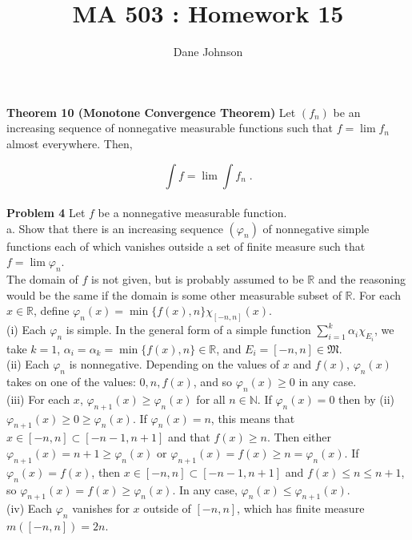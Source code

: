\documentclass[a4paper]{article}
\title{MA 503 : Homework 15}
\author{Dane Johnson}
\begin{document}
\maketitle

{\bf Theorem 10 (Monotone Convergence Theorem)} Let $(f_n)$ be an increasing sequence of nonnegative measurable functions such that $f = \lim f_n$ almost everywhere. Then,

$$\int f = \lim \int f_n \;.$$ \\

{\bf Problem 4} Let $f$ be a nonnegative measurable function. \\

a. Show that there is an increasing sequence $(\varphi_n)$ of nonnegative simple functions each of which vanishes outside a set of finite measure such that $f = \lim \varphi_n$. \\

The domain of $f$ is not given, but is probably assumed to be $\mathbb{R}$ and the reasoning would be the same if the domain is some other measurable subset of $\mathbb{R}$. For each $x \in \mathbb{R}$, define $\varphi_n(x) = \min\{f(x), n\} \chi_{[-n,n]} (x)$. \\

(i) Each $\varphi_n$ is simple. In the general form of a simple function $\sum_{i=1}^k \alpha_i \chi_{E_i}$, we take $k = 1$, $\alpha_i = \alpha_k = \min \{f(x), n\} \in \mathbb{R}$, and $E_i = [-n,n] \in \mathfrak{M}$.\\

(ii) Each $\varphi_n$ is nonnegative. Depending on the values of $x$ and $f(x)$, $\varphi_n(x)$ takes on one of the values: $0, n, f(x)$, and so $\varphi_n(x) \geq 0$ in any case. \\

(iii) For each $x$, $\varphi_{n+1}(x) \geq \varphi_n(x)$ for all $n \in \mathbb{N}$. If $\varphi_n(x) = 0$ then by (ii) $\varphi_{n+1}(x) \geq 0 \geq \varphi_n(x)$. If $\varphi_{n}(x) = n$, this means that $x \in [-n,n]\subset [-n-1, n+1]$ and that $f(x) \geq n$. Then either $\varphi_{n+1}(x) = n+1 \geq \varphi_n(x)$ or $\varphi_{n+1}(x) = f(x) \geq n = \varphi_n(x)$. If $\varphi_n(x) = f(x)$, then $x \in [-n,n] \subset [-n-1, n+1]$ and $f(x) \leq n \leq n+1$, so $\varphi_{n+1}(x) = f(x) \geq \varphi_n(x)$. In any case, $\varphi_n(x) \leq \varphi_{n+1}(x)$. \\

(iv) Each $\varphi_n$ vanishes for $x$ outside of $[-n,n]$, which has finite measure $m([-n,n]) = 2n$. \\
\end{document}
